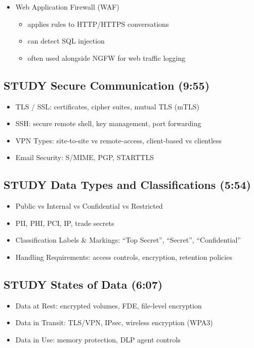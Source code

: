 \documentclass[11pt]{article}
\begin{document}
\begin{itemize}
\item Web Application Firewall (WAF)
\begin{itemize}
\item applies rules to HTTP/HTTPS conversations
\item can detect SQL injection
\item often used alongside NGFW for web traffic logging
\end{itemize}
\end{itemize}
\subsection{{\bfseries\sffamily STUDY} Secure Communication (9:55)}
\label{sec:orgd2950b1}
\begin{itemize}
\item TLS / SSL: certificates, cipher suites, mutual TLS (mTLS)
\item SSH: secure remote shell, key management, port forwarding
\item VPN Types: site‑to‑site vs remote‑access, client‑based vs clientless
\item Email Security: S/MIME, PGP, STARTTLS
\end{itemize}
\subsection{{\bfseries\sffamily STUDY} Data Types and Classifications (5:54)}
\label{sec:orge579a3c}
\begin{itemize}
\item Public vs Internal vs Confidential vs Restricted
\item PII, PHI, PCI, IP, trade secrets
\item Classification Labels \& Markings: “Top Secret”, “Secret”, “Confidential”
\item Handling Requirements: access controls, encryption, retention policies
\end{itemize}
\subsection{{\bfseries\sffamily STUDY} States of Data (6:07)}
\label{sec:orge9fd677}
\begin{itemize}
\item Data at Rest: encrypted volumes, FDE, file‑level encryption
\item Data in Transit: TLS/VPN, IPsec, wireless encryption (WPA3)
\item Data in Use: memory protection, DLP agent controls
\end{itemize}
\end{document}
